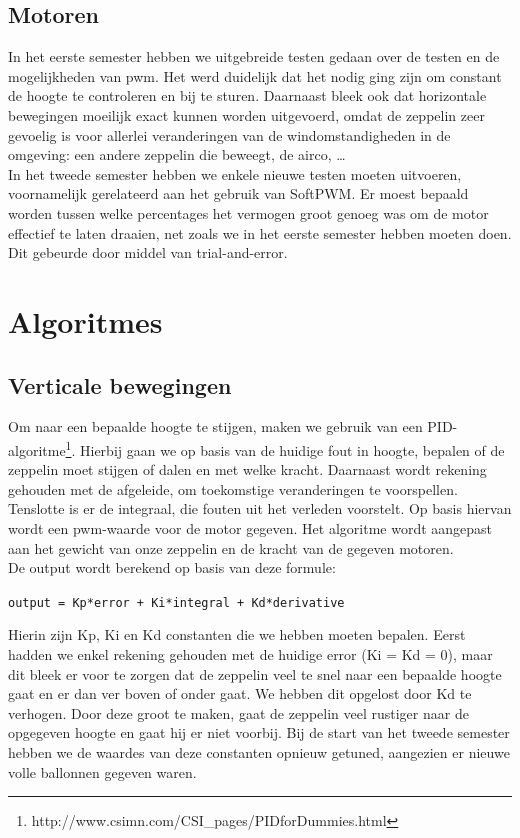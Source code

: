\documentclass[tt]{penoverslag}
\begin{document}
\subsection{Motoren}
In het eerste semester hebben we uitgebreide testen gedaan over de testen en de mogelijkheden van pwm. Het werd duidelijk dat het nodig ging zijn om constant de hoogte te controleren en bij te sturen. Daarnaast bleek ook dat horizontale bewegingen moeilijk exact kunnen worden uitgevoerd, omdat de zeppelin zeer gevoelig is voor allerlei veranderingen van de windomstandigheden in de omgeving: een andere zeppelin die beweegt, de airco, \ldots \\

In het tweede semester hebben we enkele nieuwe testen moeten uitvoeren, voornamelijk gerelateerd aan het gebruik van SoftPWM. Er moest bepaald worden tussen welke percentages het vermogen groot genoeg was om de motor effectief te laten draaien, net zoals we in het eerste semester hebben moeten doen. Dit gebeurde door middel van trial-and-error.  

\section{Algoritmes}
\subsection{Verticale bewegingen}
Om naar een bepaalde hoogte te stijgen, maken we gebruik van een PID-algoritme\footnote{http://www.csimn.com/CSI\_pages/PIDforDummies.html}. Hierbij gaan we op basis van de huidige fout in hoogte, bepalen of de zeppelin moet stijgen of dalen en met welke kracht. Daarnaast wordt rekening gehouden met de afgeleide, om toekomstige veranderingen te voorspellen. Tenslotte is er de integraal, die fouten uit het verleden voorstelt. Op basis hiervan wordt een pwm-waarde voor de motor gegeven. Het algoritme wordt aangepast aan het gewicht van onze zeppelin en de kracht van de gegeven motoren. \\
De output wordt berekend op basis van deze formule:

\begin{center}
\texttt{output = Kp*error + Ki*integral + Kd*derivative}\\
\end{center}

Hierin zijn Kp, Ki en Kd constanten die we hebben moeten bepalen. Eerst hadden we enkel rekening gehouden met de huidige error (Ki = Kd = 0), maar dit bleek er voor te zorgen dat de zeppelin veel te snel naar een bepaalde hoogte gaat en er dan ver boven of onder gaat. We hebben dit opgelost door Kd te verhogen. Door deze groot te maken, gaat de zeppelin veel rustiger naar de opgegeven hoogte en gaat hij er niet voorbij. Bij de start van het tweede semester hebben we de waardes van deze constanten opnieuw getuned, aangezien er nieuwe volle ballonnen gegeven waren. \\
\end{document}
